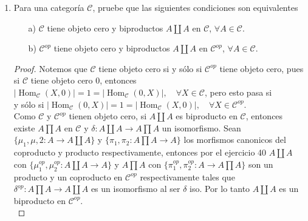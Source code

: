 \documentclass{article}
\begin{document}
\begin{enumerate}[label=\textbf{Ej \arabic*.}]
\begin{proof}
Por lo tanto $\varphi$ es un morfismo de anillos.
Notemos que, para toda $x\in P$, $proy_j\circ \varphi(x)=proy_j(x_p)=p_j(x)$ para cada $j\in \{1,2,\ldots,n\}$, por lo tanto $p_j=proy_j\circ \varphi$.\\

Por último si existiera $\eta:P\to R$ tal que $p_j=proy_j\eta$ para cada \\$j\in \{1,2,\ldots,n\}$, entonces para cada $x\in P$ se tiene que 
 $\eta(x)\in R$, es decir, $\eta(x)=(x_i)_{i=1}^n$ con $x_i\in R_i\quad \forall i\in \{1,2,\ldots,n\}$.
Ahora, como\\ $proy_j\eta(x)=p_j(x)$, entonces $x_j=p_j(x)\quad \forall j\in \{1,2,\ldots,n\}$, es decir, $\eta(x)=(p_i(x))_{i=1}^n=x_p=\varphi(x).$\\

Por lo tanto $\varphi$ es único y así $R$ y $\{proy_j:R\to R_i\}_{i=1}^n$ son un producto en $Rings$ para $\{R_i\}_{i=1}^n$.

\end{proof}


\item Para una categoría $\mathscr{C}$, pruebe que las siguientes condiciones son equivalentes

\begin{itemize}
\item[a)] $\mathscr{C}$ tiene objeto cero y biproductos $A\coprod A$ en  $\mathscr{C}$, $\forall A\in \mathscr{C}$.
\item[b)] $\mathscr{C}^{op}$ tiene objeto cero y biproductos $A\coprod A$ en  $\mathscr{C}^{op}$, $\forall A\in \mathscr{C}$.
\end{itemize}

\begin{proof}
Notemos que $\mathscr{C}$ tiene objeto cero si y sólo si $\mathscr{C}^{op}$ tiene objeto cero, pues si $\mathscr{C}$ tiene objeto cero $0$, entonces\\
$|\operatorname{Hom}_{\mathscr{C}}(X,0)|=1=|\operatorname{Hom}_{\mathscr{C}}(0,X)|,\quad \forall X\in \mathscr{C}$, pero esto pasa si \\
y sólo si $|\operatorname{Hom}_{\mathscr{C}}(0,X)|=1=|\operatorname{Hom}_{\mathscr{C}}(X,0)|,\quad \forall X\in \mathscr{C}^{op}$.\\

 Como $\mathscr{C}$ y $\mathscr{C}^{op}$ tienen objeto cero, si $A\coprod A$ es biproducto en $\mathscr{C}$, entonces 
existe $A\prod A$ en $\mathscr{C}$ y $\delta:A\coprod A\longrightarrow A\prod A$ un isomorfismo. Sean $\{\mu_1,\mu,2:A\longrightarrow A\coprod A\}$
\quad y \quad $\{\pi_1,\pi_2:A\prod A \longrightarrow A\}$ los morfismos canonicos del coproducto y producto respectivamente, entonces por el 
ejercicio 40 $A\coprod A$ con $\{\mu_1^{op},\mu_2^{op}:A\coprod A\longrightarrow A\}$ y $A\prod A$ con 
$\{\pi_1^{op},\pi_2^{op}:A\longrightarrow A\prod A \}$ son un producto y un coproducto en $\mathscr{C}^{op}$ respectivamente tales que 
$\delta^{op}:A\prod A\longrightarrow A\coprod A$ es un isomorfismo al ser $\delta$ iso. Por lo tanto $A\coprod A$ es un biproducto en 
$\mathscr{C}^{op}$.\\


\end{proof}
\end{enumerate}
\end{document}
